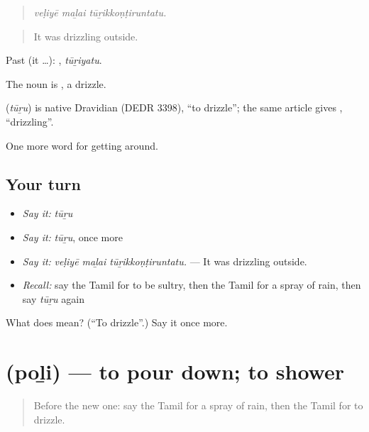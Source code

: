 \begin{quote}
\emph{veḷiyē maḻai tūṟikkoṇṭiruntatu.}
\end{quote}

\begin{quote}
It was drizzling outside.
\end{quote}

Past (it …): , \emph{tūṟiyatu}.

The noun is , a drizzle.

\begin{cousinweb}
\textbf{} (\emph{tūṟu}) is native Dravidian (DEDR 3398), \textquotedblleft{}to drizzle\textquotedblright{}; the same article gives , \textquotedblleft{}drizzling\textquotedblright{}.
\end{cousinweb}

\begin{grammarlens}[title={What you've built}]
One more word for getting around.
\end{grammarlens}

\subsection*{Your turn}
\begin{itemize}
\raggedright
  \item \emph{Say it:} \emph{tūṟu}
  \item \emph{Say it:} \emph{tūṟu}, once more
  \item \emph{Say it:} \emph{veḷiyē maḻai tūṟikkoṇṭiruntatu.} — It was drizzling outside.
  \item \emph{Recall:} say the Tamil for to be sultry, then the Tamil for a spray of rain, then say \emph{tūṟu} again
\end{itemize}

\begin{tcolorbox}[breakable,colback=teal!4,colframe=teal!35!black,title={Before you move on}]
What does  mean? (\textquotedblleft{}To drizzle\textquotedblright{}.) Say it once more.
\end{tcolorbox}
\section[\texorpdfstring{\ta{பொழி} (poḻi)}{பொழி (poḻi)}]{ (poḻi) — to pour down; to shower}

\label{lesson:TA-C428-poli}



\begin{quote}
Before the new one: say the Tamil for a spray of rain, then the Tamil for to drizzle.
\end{quote}

